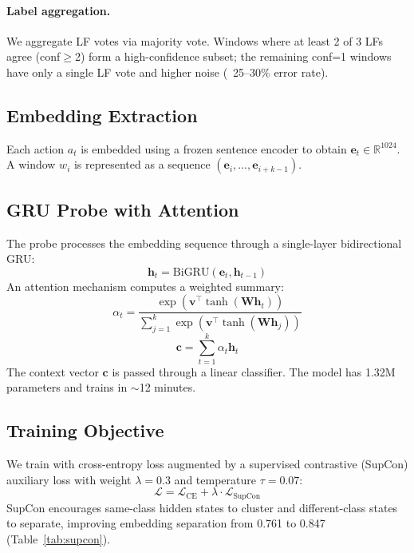 \documentclass[11pt,a4paper]{article}
\begin{document}
\paragraph{Label aggregation.}
We aggregate LF votes via majority vote.
Windows where at least 2 of 3 LFs agree (conf$\geq$2) form a high-confidence subset; the remaining conf=1 windows have only a single LF vote and higher noise (~25--30\% error rate).

\subsection{Embedding Extraction}

Each action $a_t$ is embedded using a frozen sentence encoder to obtain $\mathbf{e}_t \in \mathbb{R}^{1024}$.
A window $w_i$ is represented as a sequence $(\mathbf{e}_i, \ldots, \mathbf{e}_{i+k-1})$.

\subsection{GRU Probe with Attention}

The probe processes the embedding sequence through a single-layer bidirectional GRU:
\begin{equation}
\mathbf{h}_t = \text{BiGRU}(\mathbf{e}_t, \mathbf{h}_{t-1})
\end{equation}
An attention mechanism computes a weighted summary:
\begin{equation}
\alpha_t = \frac{\exp(\mathbf{v}^\top \tanh(\mathbf{W}\mathbf{h}_t))}{\sum_{j=1}^{k}\exp(\mathbf{v}^\top \tanh(\mathbf{W}\mathbf{h}_j))}
\end{equation}
\begin{equation}
\mathbf{c} = \sum_{t=1}^{k} \alpha_t \mathbf{h}_t
\end{equation}
The context vector $\mathbf{c}$ is passed through a linear classifier.
The model has 1.32M parameters and trains in $\sim$12 minutes.

\subsection{Training Objective}

We train with cross-entropy loss augmented by a supervised contrastive (SupCon) auxiliary loss with weight $\lambda=0.3$ and temperature $\tau=0.07$:
\begin{equation}
\mathcal{L} = \mathcal{L}_\text{CE} + \lambda \cdot \mathcal{L}_\text{SupCon}
\end{equation}
SupCon encourages same-class hidden states to cluster and different-class states to separate, improving embedding separation from 0.761 to 0.847 (Table~\ref{tab:supcon}).
\end{document}
